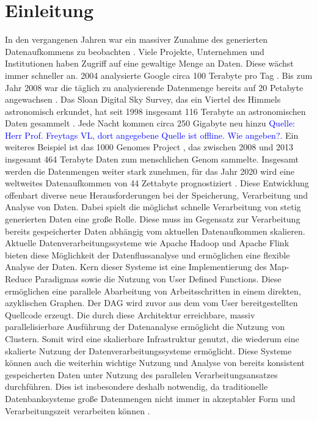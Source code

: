 \chapter{Einleitung}
In den vergangenen Jahren war ein massiver Zunahme des generierten Datenaufkommens zu beobachten \cite{EMC2014}. Viele Projekte, Unternehmen und Institutionen haben Zugriff auf eine gewaltige Menge an Daten. Diese wächst immer schneller an. 2004 analysierte Google circa 100 Terabyte pro Tag \cite{Dean2004}. Bis zum Jahr 2008 war die täglich zu analysierende Datenmenge bereits auf 20 Petabyte angewachsen \cite{Dean2008}. Das Sloan Digital Sky Survey, das ein Viertel des Himmels astronomisch erkundet, hat seit 1998 insgesamt 116 Terabyte an astronomischen Daten gesammelt \cite{York2000, Alam2015}. Jede Nacht kommen circa 250 Gigabyte neu hinzu \textcolor{blue}{Quelle: Herr Prof. Freytags VL, dort angegebene Quelle ist offline. Wie angeben?}. Ein weiteres Beispiel ist das 1000 Genomes Project \cite{Baker2010}, das zwischen 2008 und 2013 insgesamt 464 Terabyte Daten zum menschlichen Genom sammelte. Insgesamt werden die Datenmengen weiter stark zunehmen, für das Jahr 2020 wird eine weltweites Datenaufkommen von 44 Zettabyte prognostiziert \cite{EMC2014}. 
Diese Entwicklung offenbart diverse neue Herausforderungen bei der Speicherung, Verarbeitung und Analyse von Daten. Dabei spielt die möglichst schnelle Verarbeitung von stetig generierten Daten eine große Rolle. Diese muss im Gegensatz zur Verarbeitung bereits gespeicherter Daten abhängig vom aktuellen Datenaufkommen skalieren. Aktuelle Datenverarbeitungssysteme wie Apache Hadoop \cite{HadoopWebsite} und Apache Flink \cite{FlinkWebsite} bieten diese Möglichkeit der Datenflussanalyse und ermöglichen eine flexible Analyse der Daten. Kern dieser Systeme ist eine Implementierung des Map-Reduce Paradigmas \cite{Dean2008} sowie die Nutzung von User Defined Functions. Diese ermöglichen eine parallele Abarbeitung von Arbeitsschritten in einem direkten, azyklischen Graphen. Der DAG wird zuvor aus dem vom User bereitgestellten Quellcode erzeugt. Die durch diese Architektur erreichbare, massiv parallelisierbare Ausführung der Datenanalyse ermöglicht die Nutzung von Clustern. Somit wird eine skalierbare Infrastruktur genutzt, die wiederum eine skalierte Nutzung der Datenverarbeitungssysteme ermöglicht. Diese Systeme können auch die weiterhin wichtige Nutzung und Analyse von bereits konsistent gespeicherten Daten unter Nutzung des parallelen Verarbeitungsansatzes durchführen. Dies ist insbesondere deshalb notwendig, da traditionelle Datenbanksysteme große Datenmengen nicht immer in akzeptabler Form und Verarbeitungszeit verarbeiten können \cite{Jacobs2009}.
